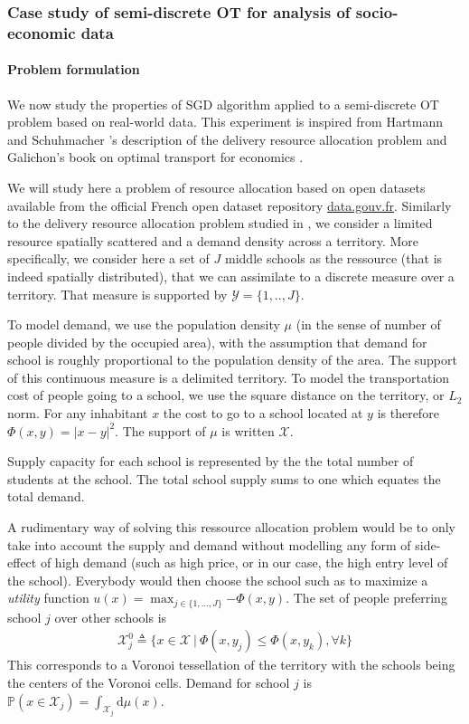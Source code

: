 \subsubsection{Case study of semi-discrete OT for analysis of socio-economic data}

\paragraph{Problem formulation}\label{par:semi-discrete-prob}
We now study the properties of SGD algorithm applied to a semi-discrete OT problem based on real-world data. This experiment is inspired from Hartmann and Schuhmacher 's description of the delivery resource allocation problem \cite{hartmann_semi-discrete_2017} and Galichon's book on optimal transport for economics \cite{galichon_optimal_2018}. 

We will study here a problem of resource allocation based on open datasets available from the official French open dataset repository \href{www.data.gouv.fr}{\url{data.gouv.fr}}. Similarly to the delivery resource allocation problem studied in \cite{hartmann_semi-discrete_2017}, we consider a limited resource spatially scattered and a demand density across a territory. More specifically, we consider here a set of $J$ middle schools as the ressource (that is indeed spatially distributed), that we can assimilate to a discrete measure over a territory. That measure is supported by $\mathcal{Y} = \{1, .., J\}$.

To model demand, we use the population density $\mu$ (in the sense of number of people divided by the occupied area), with the assumption that demand for school is roughly proportional to the population density of the area. The support of this continuous measure is a delimited territory. To model the transportation cost of people going to a school, we use the square distance on the territory, or $L_2$ norm. For any inhabitant $x$ the cost to go to a school located at $y$ is therefore $\Phi(x, y) = |x-y|^2$. The support of $\mu$ is written $\mathcal{X}$.

Supply capacity for each school is represented by the the total number of students at the school. The total school supply sums to one which equates the total demand. 

A rudimentary way of solving this ressource allocation problem would be to only take into account the supply and demand without modelling any form of side-effect of high demand (such as high price, or in our case, the high entry level of the school). Everybody would then choose the school such as to maximize a \emph{utility} function $u(x) = \max_{j\in\{1, ..., J\}} {-\Phi(x, y)}$. 
The set of people preferring school $j$ over other schools is
\begin{align*}
    \mathcal{X}_j^0 \triangleq \{ x \in \mathcal{X} \ |\ \Phi(x, y_j)\leq \Phi(x, y_k), \forall k\}
\end{align*}
This corresponds to a Voronoi tessellation of the territory with the schools being the centers of the Voronoi cells.
Demand for school $j$ is $\mathbb{P}(x\in \mathcal{X}_j) = \int_{\mathcal{X}_j} \text{d}\mu(x)$. 

